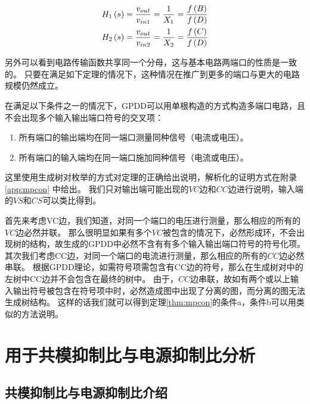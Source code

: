 \begin{eqnarray}
{H_1}\left( s \right) = \frac{{{v_{out}}}}
{{{v_{in1}}}} = \frac{1}
{{{X_1}}} = \frac{{f\left( B \right)}}
{{f\left( D \right)}} \hfill \\
{H_2}\left( s \right) = \frac{{{v_{out}}}}
{{{v_{in2}}}} = \frac{1}
{{{X_2}}} = \frac{{f\left( C \right)}}
{{f\left( D \right)}} \hfill 
\end{eqnarray}

另外可以看到电路传输函数共享同一个分母，这与基本电路两端口的性质是一致的。
只要在满足如下定理的情况下，这种情况在推广到更多的端口与更大的电路规模仍然成立。

\begin{thm}\label{thm:mpcon}
	在满足以下条件之一的情况下，GPDD可以用单根构造的方式构造多端口电路，且不会出现多个输入输出端口符号的交叉项：
	\begin{enumerate}[label=\emph{\alph*})]
		\item 所有端口的输出端均在同一端口测量同种信号（电流或电压）。
		\item 所有端口的输入端均在同一端口施加同种信号（电流或电压）。
	\end{enumerate}
\end{thm}

这里使用生成树对枚举的方式对定理的正确给出说明，解析化的证明方式在附录\ref{app:mpcon} 中给出。
我们只对输出端可能出现的$VC$边和$CC$边进行说明，输入端的$VS$和$CS$可以类比得到。

首先来考虑VC边，我们知道，对同一个端口的电压进行测量，那么相应的所有的$VC$边必然并联。
那么很明显如果有多个$VC$被包含的情况下，必然形成环，不会出现树的结构，故生成的GPDD中必然不含有有多个输入输出端口符号的符号化项。
其次我们考虑CC边，对同一个端口的电流进行测量，那么相应的所有的$CC$边必然串联。
根据GPDD理论\parencite{GShi-GPDD}，如需符号项需包含有CC边的符号，那么在生成树对中的左树中CC边并不会包含在最终的树中。
由于，$CC$边串联，故如有两个或以上输入输出符号被包含在符号项中时，必然造成图中出现了分离的图，而分离的图无法生成树结构。
这样的话我们就可以得到定理\ref{thm:mpcon}的条件a，条件b可以用类似的方法说明。

\section{用于共模抑制比与电源抑制比分析}
\label{sec:cmps:cmrrpsrr}

\subsection{共模抑制比与电源抑制比介绍}
\label{subsec:cmps:cmrrpsrr:intro}

